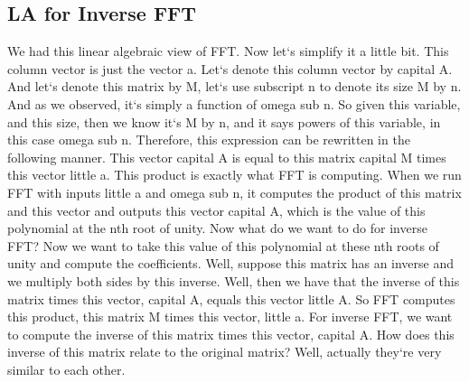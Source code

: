 \subsection{LA for Inverse FFT}
We had this linear algebraic view of FFT\@.
Now let`s simplify it a little bit.
This column vector is just the vector a.
Let`s denote this column vector by capital A\@.
And let`s denote this matrix by M, let`s use subscript n to denote its size M by n.
And as we observed, it`s simply a function of omega sub n.
So given this variable, and this size, then we know it`s M by n, and it says powers of this variable, in this case omega sub n.
Therefore, this expression can be rewritten in the following manner.
This vector capital A is equal to this matrix capital M times this vector little a.
This product is exactly what FFT is computing.
When we run FFT with inputs little a and omega sub n, it computes the product of this matrix and this vector and outputs this vector capital A, which is the value of this polynomial at the nth root of unity.
Now what do we want to do for inverse FFT? Now we want to take this value of this polynomial at these nth roots of unity and compute the coefficients.
Well, suppose this matrix has an inverse and we multiply both sides by this inverse.
Well, then we have that the inverse of this matrix times this vector, capital A, equals this vector little A\@.
So FFT computes this product, this matrix M times this vector, little a.
For inverse FFT, we want to compute the inverse of this matrix times this vector, capital A\@.
How does this inverse of this matrix relate to the original matrix? Well, actually they`re very similar to each other.

